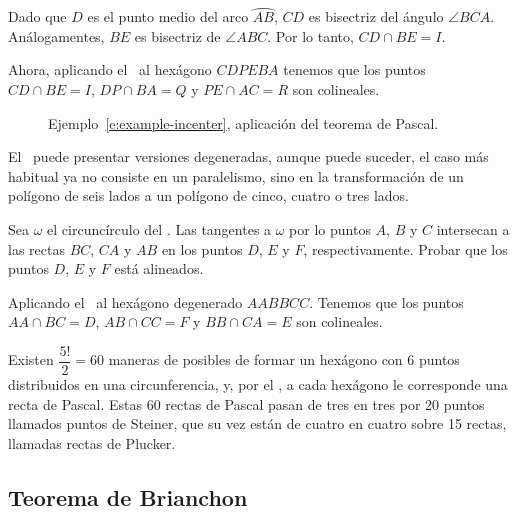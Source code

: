 \begin{solution}
    Dado que $D$ es el punto medio del arco $\wideparen{AB}$, $CD$ es bisectriz del ángulo $\angle BCA$.
    Análogamentes, $BE$ es bisectriz de $\angle ABC$.
    Por lo tanto, $CD \cap BE = I$.

    Ahora, aplicando el~ al hexágono $CDPEBA$ tenemos que los puntos $CD \cap BE = I$, $DP \cap BA = Q$ y $PE \cap AC = R$ son colineales.
\end{solution}

\begin{figure}[H]
    \centering
    
    \caption{Ejemplo~\ref{e:example-incenter}, aplicación del teorema de Pascal.}
\end{figure}


El~ puede presentar versiones degeneradas, aunque puede suceder, el caso más habitual ya no consiste en un paralelismo, sino en la transformación de un polígono de seis lados a un polígono de cinco, cuatro o tres lados.


\begin{section-example.tcb}{}{}
    Sea $\omega$ el circuncírculo del .
    Las tangentes a $\omega$ por lo puntos $A$, $B$ y $C$ intersecan a las rectas $BC$, $CA$ y $AB$ en los puntos $D$, $E$ y $F$, respectivamente.
    Probar que los puntos $D$, $E$ y $F$ está alineados.
\end{section-example.tcb}

\begin{figure}[H]
    \centering
    
\end{figure}

\begin{solution}
    Aplicando el~ al hexágono degenerado $AABBCC$.
    Tenemos que los puntos $AA \cap BC = D$, $AB \cap CC = F$ y $BB \cap CA = E$ son colineales.
\end{solution}

Existen $\dfrac{5!}{2} = 60$ maneras de posibles de formar un hexágono con 6 puntos distribuidos en una circunferencia, y, por el , a cada hexágono le corresponde una recta de Pascal.
Estas 60 rectas de Pascal pasan de tres en tres por 20 puntos llamados puntos de Steiner, que su vez están de cuatro en cuatro sobre 15 rectas, llamadas rectas de Plucker.



\subsection{Teorema de Brianchon}


